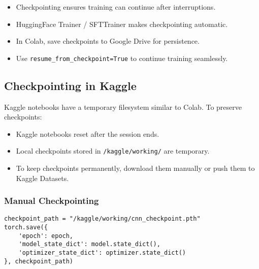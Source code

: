 \begin{tcolorbox}[colback=green!5!white, colframe=green!75!black, title=Summary]
\begin{itemize}
    \item Checkpointing ensures training can continue after interruptions.
    \item HuggingFace Trainer / SFTTrainer makes checkpointing automatic.
    \item In Colab, save checkpoints to Google Drive for persistence.
    \item Use \texttt{resume\_from\_checkpoint=True} to continue training seamlessly.
\end{itemize}
\end{tcolorbox}



\newpage
\subsection{Checkpointing in Kaggle}

Kaggle notebooks have a temporary filesystem similar to Colab. To preserve checkpoints:

\begin{tcolorbox}[colback=blue!5!white, colframe=blue!75!black, title=Important Note]
\begin{itemize}
    \item Kaggle notebooks reset after the session ends.
    \item Local checkpoints stored in \texttt{/kaggle/working/} are temporary.
    \item To keep checkpoints permanently, download them manually or push them to Kaggle Datasets.
\end{itemize}
\end{tcolorbox}

\subsubsection{Manual Checkpointing}

\begin{tcolorbox}[colback=yellow!5!white, colframe=yellow!75!black, title=Example: Save to Kaggle Working Folder]
\begin{verbatim}
checkpoint_path = "/kaggle/working/cnn_checkpoint.pth"
torch.save({
    'epoch': epoch,
    'model_state_dict': model.state_dict(),
    'optimizer_state_dict': optimizer.state_dict()
}, checkpoint_path)
\end{verbatim}
\end{tcolorbox}

